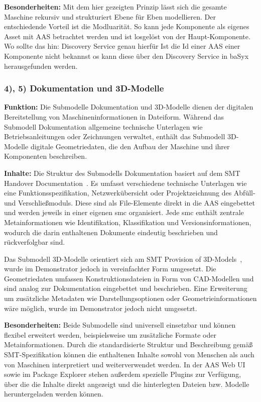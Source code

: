 \textbf{Besonderheiten:}  
Mit dem hier gezeigten Prinzip lässt sich die gesamte Maschine rekursiv und strukturiert Ebene für Eben modellieren.
Der entschiedende Vorteil ist die Modluarität. 
So kann jede Komponente als eigenes Asset mit AAS betrachtet werden und ist losgelöst von der Haupt-Komponente.
Wo sollte das hin: Discovery Service genau hierfür Ist die Id einer AAS einer Komponente nicht bekannst os kann diese über den Discovery Service in baSyx herausgefunden werden.

\subsubsection*{4), 5) Dokumentation und 3D-Modelle}
\vspace{-0.5em}

\textbf{Funktion:}  
Die Submodelle Dokumentation und 3D-Modelle dienen der digitalen Bereitstellung von Maschineninformationen in Dateiform.
Während das Submodell Dokumentation allgemeine technische Unterlagen wie Betriebsanleitungen oder Zeichnungen verwaltet, enthält das Submodell 3D-Modelle digitale Geometriedaten, die den Aufbau der Maschine und ihrer Komponenten beschreiben.

\textbf{Inhalte:}  
Die Struktur des Submodells Dokumentation basiert auf dem SMT Handover Documentation~\cite{SpezifikationDokumentation}.
Es umfasst verschiedene technische Unterlagen wie eine Funktionsspezifikation, Netzwerkübersicht oder Projektzeichnung des Abfüll- und Verschließmoduls.
Diese sind als File-Elemente direkt in die AAS eingebettet und werden jeweils in einer eigenen \acs{smc} organisiert.
Jede \acs{smc} enthält zentrale Metainformationen wie Identifikation, Klassifikation und Versionsinformationen, wodurch die darin enthaltenen Dokumente eindeutig beschrieben und rückverfolgbar sind.

Das Submodell 3D-Modelle orientiert sich am SMT Provision of 3D-Models~\cite{Spezifikation3DModelle}, wurde im Demonstrator jedoch in vereinfachter Form umgesetzt.
Die Geometriedaten umfassen Konstruktionsdateien in Form von CAD-Modellen und sind analog zur Dokumentation eingebettet und beschrieben.
Eine Erweiterung um zusätzliche Metadaten wie Darstellungsoptionen oder Geometrieinformationen wäre möglich, wurde im Demonstrator jedoch nicht umgesetzt.

\textbf{Besonderheiten:}  
Beide Submodelle sind universell einsetzbar und können flexibel erweitert werden, beispielsweise um zusätzliche Formate oder Metainformationen.
Durch die standardisierte Struktur und Beschreibung gemäß SMT-Spezifikation können die enthaltenen Inhalte sowohl von Menschen als auch von Maschinen interpretiert und weiterverwendet werden.
In der AAS Web UI sowie im Package Explorer stehen außerdem spezielle Plugins zur Verfügung, über die die Inhalte direkt angezeigt und die hinterlegten Dateien bzw. Modelle heruntergeladen werden können.

